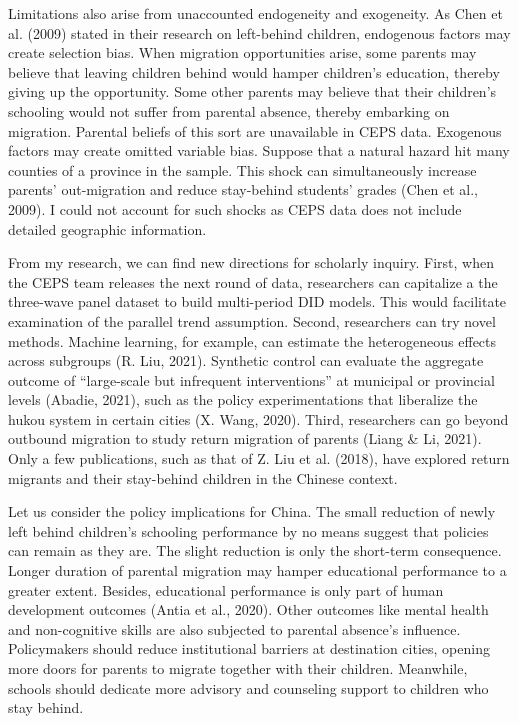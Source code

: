 \documentclass[
  man,floatsintext]{apa7}
\begin{document}
Limitations also arise from unaccounted endogeneity and exogeneity. As Chen et al. (2009) stated in their research on left-behind children, endogenous factors may create selection bias. When migration opportunities arise, some parents may believe that leaving children behind would hamper children's education, thereby giving up the opportunity. Some other parents may believe that their children's schooling would not suffer from parental absence, thereby embarking on migration. Parental beliefs of this sort are unavailable in CEPS data. Exogenous factors may create omitted variable bias. Suppose that a natural hazard hit many counties of a province in the sample. This shock can simultaneously increase parents' out-migration and reduce stay-behind students' grades (Chen et al., 2009). I could not account for such shocks as CEPS data does not include detailed geographic information.

From my research, we can find new directions for scholarly inquiry. First, when the CEPS team releases the next round of data, researchers can capitalize a the three-wave panel dataset to build multi-period DID models. This would facilitate examination of the parallel trend assumption. Second, researchers can try novel methods. Machine learning, for example, can estimate the heterogeneous effects across subgroups (R. Liu, 2021). Synthetic control can evaluate the aggregate outcome of ``large-scale but infrequent interventions'' at municipal or provincial levels (Abadie, 2021), such as the policy experimentations that liberalize the hukou system in certain cities (X. Wang, 2020). Third, researchers can go beyond outbound migration to study return migration of parents (Liang \& Li, 2021). Only a few publications, such as that of Z. Liu et al. (2018), have explored return migrants and their stay-behind children in the Chinese context.

Let us consider the policy implications for China. The small reduction of newly left behind children's schooling performance by no means suggest that policies can remain as they are. The slight reduction is only the short-term consequence. Longer duration of parental migration may hamper educational performance to a greater extent. Besides, educational performance is only part of human development outcomes (Antia et al., 2020). Other outcomes like mental health and non-cognitive skills are also subjected to parental absence's influence. Policymakers should reduce institutional barriers at destination cities, opening more doors for parents to migrate together with their children. Meanwhile, schools should dedicate more advisory and counseling support to children who stay behind.
\end{document}
